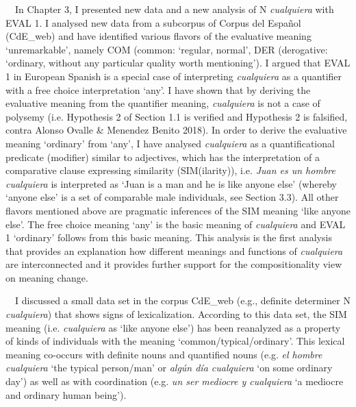 \documentclass[10pt]{article}
\newenvironment{styleStandard}{\renewcommand\baselinestretch{1.25}\setlength\leftskip{0cm}\setlength\rightskip{0cm}\setlength\parindent{0cm}\setlength\parfillskip{0pt plus 1fil}\setlength\parskip{0in plus 1pt}\writerlistparindent\writerlistleftskip\leavevmode\normalfont\normalsize\fontsize{12pt}{14.4pt}\selectfont\writerlistlabel\ignorespaces}{\unskip\vspace{0in plus 1pt}\par}
\newcommand\writerlistleftskip{}
\newcommand\writerlistparindent{}
\newcommand\writerlistlabel{}
\begin{document}
\begin{styleStandard}
\ \ In Chapter 3, I presented new data and a new analysis of N \textit{cualquiera} with EVAL 1. I analysed new data from a subcorpus of Corpus del Español (CdE\_web) and have identified various flavors of the evaluative meaning ‘unremarkable’, namely COM (common: ‘regular, normal’, DER (derogative: ‘ordinary, without any particular quality worth mentioning’). I argued that EVAL 1 in European Spanish is a special case of interpreting \textit{cualquiera} as a quantifier with a free choice interpretation ‘any’. I have shown that by deriving the evaluative meaning from the quantifier meaning, \textit{cualquiera} is not a case of polysemy (i.e. Hypothesis 2 of Section 1.1 is verified and Hypothesis 2 is falsified, contra Alonso Ovalle \& Menendez Benito 2018). In order to derive the evaluative meaning ‘ordinary’ from ‘any’, I have analysed \textit{cualquiera} as a quantificational predicate (modifier) similar to adjectives, which has the interpretation of a comparative clause expressing similarity (SIM(ilarity)), i.e. \textit{Juan es un hombre cualquiera} is interpreted as ‘Juan is a man and he is like anyone else’ (whereby ‘anyone else’ is a set of comparable male individuals, see Section 3.3). All other flavors mentioned above are pragmatic inferences of the SIM meaning ‘like anyone else’. The free choice meaning ‘any’ is the basic meaning of \textit{cualquiera} and EVAL 1 ‘ordinary’ follows from this basic meaning. This analysis is the first analysis that provides an explanation how different meanings and functions of \textit{cualquiera} are interconnected and it provides further support for the compositionality view on meaning change.
\end{styleStandard}

\begin{styleStandard}
\ \ I discussed a small data set in the corpus CdE\_web (e.g., definite determiner N \textit{cualquiera}) that shows signs of lexicalization. According to this data set, the SIM meaning (i.e. \textit{cualquiera} as ‘like anyone else’) has been reanalyzed as a property of kinds of individuals with the meaning ‘common/typical/ordinary’. This lexical meaning co-occurs with definite nouns and quantified nouns (e.g. \textit{el hombre cualquiera} ‘the typical person/man’ or \textit{algún día cualquiera} ‘on some ordinary day’) as well as with coordination (e.g. \textit{un ser mediocre y cualquiera} ‘a mediocre and ordinary human being’).
\end{styleStandard}
\end{document}
